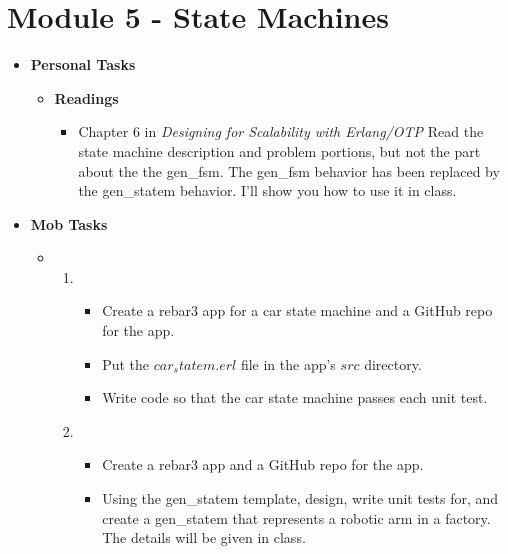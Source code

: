 \documentclass[12pt]{amsart}
\begin{document}
\section*{Module 5 - State Machines}
	 \begin{itemize}
		\item\textbf{ Personal Tasks}
            		\begin{itemize}
                    		\item \textbf{Readings}
                    		\begin{itemize}
                    			\item Chapter 6 in \textit{Designing for Scalability with Erlang/OTP} Read the state machine description and problem portions, but not the part about the the gen\_fsm. The gen\_fsm behavior has been replaced by the gen\_statem behavior. I'll show you how to use it in class. 
                    		\end{itemize}
			\end{itemize}
		\item \textbf{Mob Tasks}
		\begin{itemize}
			\item\begin{enumerate}
			\item\begin{itemize}
            			\item Create a rebar3 app for a car state machine and a GitHub repo for the app.
            			\item Put the $car_statem.erl$ file in the app's $src$ directory.
            			\item Write code so that the car state machine passes each unit test.
			\end{itemize}
			\item\begin{itemize}
            			\item Create a rebar3 app and a GitHub repo for the app.
            			\item Using the gen\_statem template, design, write unit tests for, and create a gen\_statem that represents a robotic arm in a factory. The details will be given in class.
			\end{itemize}
			\end{enumerate}
		\end{itemize}
	\end{itemize}
\end{document}
